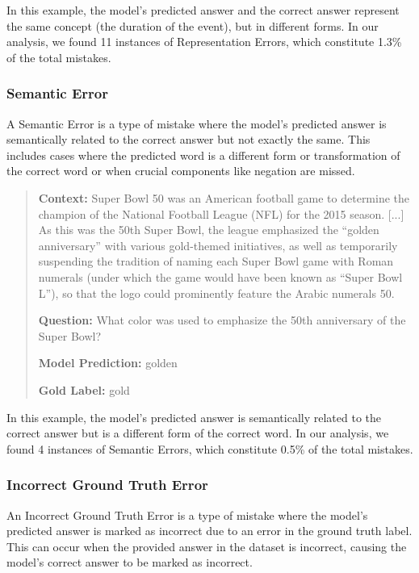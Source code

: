 \documentclass{article}
\begin{document}
In this example, the model's predicted answer and the correct answer represent
the same concept (the duration of the event), but in different forms.
In our analysis, we found 11 instances of
Representation Errors, which constitute 1.3\% of the total mistakes.


\subsubsection*{Semantic Error}

A Semantic Error is a type of mistake where the model's predicted
answer is semantically related to the correct answer but not exactly
the same. This includes cases where the predicted word is a different
form or transformation of the correct word or when crucial components
like negation are missed.

\begin{quote}
\textbf{Context:} Super Bowl 50 was an American football game to
determine the champion of the National Football League (NFL) for the
2015 season. [...] As this was the 50th Super Bowl,
the league emphasized the ``golden anniversary'' with various gold-themed
initiatives, as well as temporarily suspending the tradition of naming
each Super Bowl game with Roman numerals (under which the game would
have been known as ``Super Bowl L''), so that the logo could prominently
feature the Arabic numerals 50.

\textbf{Question:} What color was used to emphasize the 50th
anniversary of the Super Bowl?

\textbf{Model Prediction:} golden

\textbf{Gold Label:} gold
\end{quote}

In this example, the model's predicted answer is semantically related
to the correct answer but is a different form of the correct word.
In our analysis, we found 4 instances of Semantic Errors, which
constitute 0.5\% of the total mistakes.

\subsubsection*{Incorrect Ground Truth Error}

An Incorrect Ground Truth Error is a type of mistake where the model's predicted
answer is marked as incorrect due to an error in the ground truth label. This
can occur when the provided answer in the dataset is incorrect, causing the
model's correct answer to be marked as incorrect.
\end{document}
